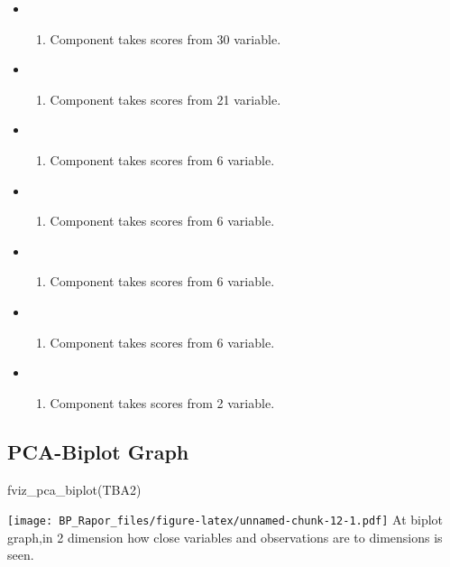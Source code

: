 \documentclass[12pt,twoside]{deuthesis}
\newenvironment{Shaded}{\begin{snugshade}}{\end{snugshade}}
\newcommand{\FunctionTok}[1]{\textcolor[rgb]{0.00,0.00,0.00}{#1}}
\newcommand{\NormalTok}[1]{#1}
\providecommand{\tightlist}{%
  \setlength{\itemsep}{0pt}\setlength{\parskip}{0pt}}
\begin{document}
\begin{itemize}
\item
  \begin{enumerate}
  \def\labelenumi{\arabic{enumi}.}
  \tightlist
  \item
    Component takes scores from 30 variable.
  \end{enumerate}
\item
  \begin{enumerate}
  \def\labelenumi{\arabic{enumi}.}
  \setcounter{enumi}{1}
  \tightlist
  \item
    Component takes scores from 21 variable.
  \end{enumerate}
\item
  \begin{enumerate}
  \def\labelenumi{\arabic{enumi}.}
  \setcounter{enumi}{2}
  \tightlist
  \item
    Component takes scores from 6 variable.
  \end{enumerate}
\item
  \begin{enumerate}
  \def\labelenumi{\arabic{enumi}.}
  \setcounter{enumi}{3}
  \tightlist
  \item
    Component takes scores from 6 variable.
  \end{enumerate}
\item
  \begin{enumerate}
  \def\labelenumi{\arabic{enumi}.}
  \setcounter{enumi}{4}
  \tightlist
  \item
    Component takes scores from 6 variable.
  \end{enumerate}
\item
  \begin{enumerate}
  \def\labelenumi{\arabic{enumi}.}
  \setcounter{enumi}{5}
  \tightlist
  \item
    Component takes scores from 6 variable.
  \end{enumerate}
\item
  \begin{enumerate}
  \def\labelenumi{\arabic{enumi}.}
  \setcounter{enumi}{6}
  \tightlist
  \item
    Component takes scores from 2 variable.
  \end{enumerate}
\end{itemize}
\hypertarget{pca-biplot-graph}{%
\subsection{PCA-Biplot Graph}\label{pca-biplot-graph}}
\begin{Shaded}
\begin{Highlighting}[]
\FunctionTok{fviz\_pca\_biplot}\NormalTok{(TBA2)}
\end{Highlighting}
\end{Shaded}
\texttt{[image: BP\_Rapor\_files/figure-latex/unnamed-chunk-12-1.pdf]}
At biplot graph,in 2 dimension how close variables and observations are to dimensions is seen.
\end{document}
